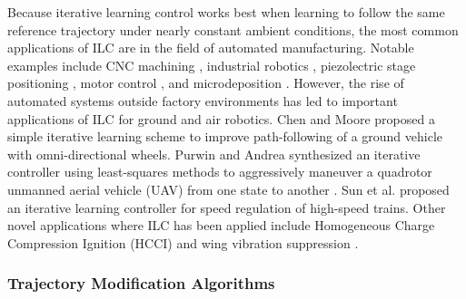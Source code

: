 \documentclass[9pt,shortpaper,twoside,web]{ieeecolor}
\begin{document}
Because iterative learning control works best when learning to follow the same reference trajectory under nearly constant ambient conditions, the most common applications of ILC are in the field of automated manufacturing. Notable examples include CNC machining \cite{kimdi}, industrial robotics \cite{freeman}\cite{hladowski}, piezolectric stage positioning \cite{huang}, motor control \cite{mohammad}, and microdeposition \cite{hoelzle}. However, the rise of automated systems outside factory environments has led to important applications of ILC for ground and air robotics. Chen and Moore \cite{chen} proposed a simple iterative learning scheme to improve path-following of a ground vehicle with omni-directional wheels. Purwin and Andrea synthesized an iterative controller using least-squares methods to aggressively maneuver a quadrotor unmanned aerial vehicle (UAV) from one state to another \cite{purwin}. Sun et al. \cite{sun} proposed an iterative learning controller for speed regulation of high-speed trains. Other novel applications where ILC has been applied include Homogeneous Charge Compression Ignition (HCCI) \cite{slepicka2016iterative} and wing vibration suppression \cite{xu2015iterative}.  

\subsubsection{Trajectory Modification Algorithms}
\end{document}
